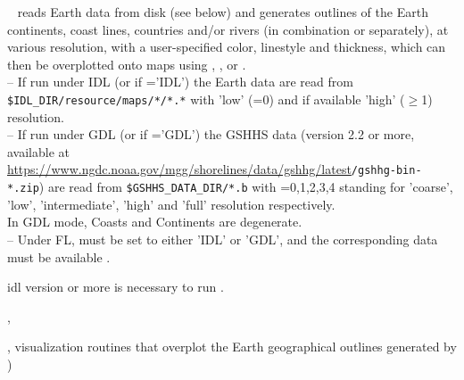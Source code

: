 \begin{codedescription}
{\thedocid\ 
 reads Earth data from disk (see below) and generates outlines of the Earth continents, coast lines, 
countries and/or rivers (in combination or separately), at various resolution, with a user-specified color, linestyle and thickness, which can then be overplotted onto \healpix maps using 
,
,
 or
.
\\
-- If run under IDL (or if ='IDL') 
  the Earth data are read from
  \texttt{\${IDL\_DIR}/resource/maps/*/*.*}
  with 'low' (=0) and if available 'high' ($\ge$1) resolution.
\\
-- If run under GDL (or if ='GDL') the GSHHS data 
  (version 2.2 or more, available at 
  \url{https://www.ngdc.noaa.gov/mgg/shorelines/data/gshhg/latest}\texttt{/gshhg-bin-*.zip})
  are read from \texttt{\${GSHHS\_DATA\_DIR}/*.b}
  with =0,1,2,3,4 standing for 'coarse', 'low', 'intermediate', 
  'high' and 'full' resolution respectively.\\
  In GDL mode, Coasts and Continents are degenerate.
\\
-- Under FL,  must be set to either 'IDL' or 'GDL', 
  and the corresponding data must be available .
}
\end{codedescription}


\begin{related}
  \begin{sulist}{} %
    \item[idl] version \idlversion or more is necessary to run \thedocid.
    \item[\htmlref{cartview}{idl:cartview}, \htmlref{gnomview}{idl:gnomview}]
    \item[\htmlref{mollview}{idl:mollview}, \htmlref{orthview}{idl:orthview}] 
visualization routines that overplot the Earth geographical outlines generated by \thedocid)
  \end{sulist}
\end{related}

